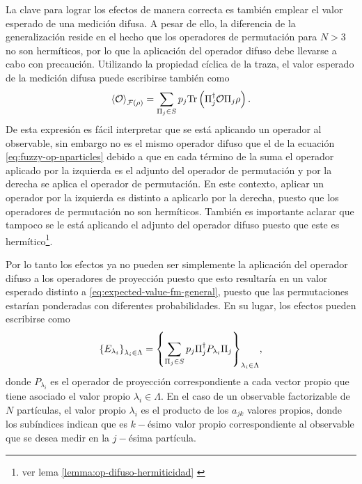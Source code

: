 La clave para lograr los efectos de manera correcta es también emplear el valor
esperado de una medición difusa. A pesar de ello, la diferencia de la
generalización reside en el hecho que los operadores de permutación para $N>3$
no son hermíticos, por lo que la aplicación del operador difuso debe llevarse a
cabo con precaución. Utilizando la propiedad cíclica de la traza, el valor
esperado de la medición difusa puede escribirse también como
\begin{equation}\label{eq:ExpectedValue-generalForm-2}\begin{split}
    \left \langle \mathcal{O}\right \rangle_{\mathcal{F}(\rho)} &=\sum_{\Pi_j \in S}p_j{\rm Tr} \left(\Pi_j^\dagger{\mathcal{O}}\Pi_j\rho\right).\\
\end{split}
\end{equation} 
De esta expresión es fácil interpretar  que se
está aplicando un operador al observable,
sin embargo no es el mismo operador difuso que el de la ecuación
{\eqref{eq:fuzzy-op-nparticles}} debido a que en cada término de la suma el
operador aplicado por la izquierda es el adjunto del operador de permutación y
por la derecha se aplica el operador de permutación. En este contexto, aplicar un operador por la
izquierda es distinto a aplicarlo por la derecha, puesto que los
operadores de permutación no son hermíticos. También
es importante aclarar
que tampoco se le está aplicando el adjunto del operador difuso puesto que este
es hermítico\footnote[3]{ver lema {\ref{lemma:op-difuso-hermiticidad} }}. 


Por lo tanto los efectos ya no pueden ser simplemente la aplicación del
operador difuso a los operadores de proyección puesto que esto resultaría en un
valor esperado distinto a {\eqref{eq:expected-value-fm-general}}, puesto que
las permutaciones estarían ponderadas con diferentes probabilidades. En su
lugar, los efectos pueden escribirse como
\begin{equation}\label{eq:effectsSetNp}
    {\{E_{\lambda_i}\}}_{\lambda_i \in \Lambda}={\left\{\sum_{\Pi_j \in S} p_j \Pi_{j}^{\dagger}P_{\lambda_i}\Pi_{j}\right\}}_{\lambda_i \in \Lambda},
\end{equation}  
donde $P_{\lambda_i}$ es el operador de proyección correspondiente a cada
vector propio que tiene asociado el valor propio $\lambda_i\in \Lambda$.  En el
caso de un observable factorizable de $N$ partículas,  el valor propio
$\lambda_i$ es el producto de los $a_{jk}$ valores propios, donde los
subíndices indican que es $k-$ésimo valor propio correspondiente al observable
que se desea medir en la $j-$ésima partícula.


